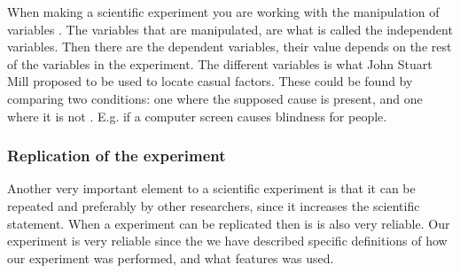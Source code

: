 When making a scientific experiment you are working with the manipulation of variables \citep[page 21]{Design}. The variables that are manipulated, are what is called the independent variables. Then there are the dependent variables, their value depends on the rest of the variables in the experiment\citep[page 21]{Design}. The different variables is what John Stuart Mill proposed to be used to locate casual factors. These could be found by comparing two conditions: one where the supposed cause is present, and one where it is not \citep[page 20]{Design}. E.g. if a computer screen causes blindness for people.

\subsubsection{Replication of the experiment}
Another very important element to a scientific experiment is that it can be repeated and preferably by other researchers, since it increases the scientific statement\citep[page 26]{Design}. When a experiment can be replicated then is is also very reliable. 
Our experiment is very reliable since the we have described specific definitions of how our experiment was performed, and what features was used.